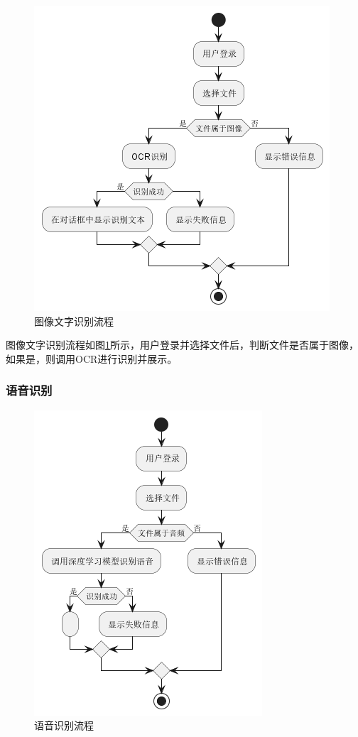 \begin{figure}[H]
    \begin{center}
        \includegraphics[scale=0.7]{examples/文字识别流程图.png}
        \caption{图像文字识别流程}
        \label{fig:textreg}
    \end{center}
\end{figure}

图像文字识别流程如图\ref{fig:textreg}所示，用户登录并选择文件后，判断文件是否属于图像，如果是，则调用OCR进行识别并展示。

\subsubsection{语音识别}

\begin{figure}[H]
    \begin{center}
        \includegraphics[scale=0.7]{examples/语音识别流程图.png}
        \caption{语音识别流程}
        \label{fig:audioreg}
    \end{center}
\end{figure}

